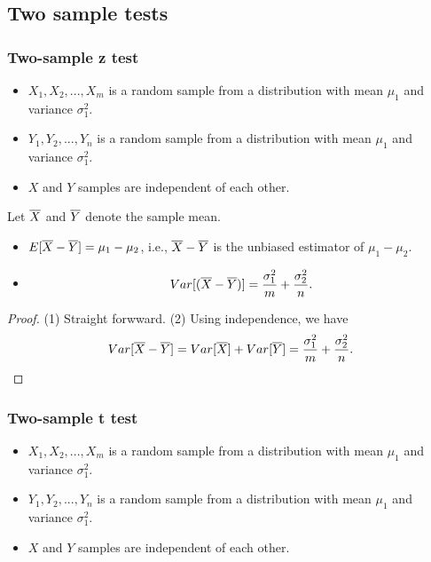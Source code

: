 \begin{refsection}
\subsection{Two sample tests}

\subsubsection{Two-sample z test}
\begin{note}\hfill
\begin{itemize}
	\item $X_1,X_2,...,X_m$ is a random sample from a distribution with mean $\mu_1$ and variance $\sigma_1^2$.
	\item $Y_1,Y_2,...,Y_n$ is a random sample from a distribution with mean $\mu_1$ and variance $\sigma_1^2$.
	\item $X$ and $Y$ samples are independent of each other. 
\end{itemize}	
\end{note}


\begin{lemma}\cite[363]{devore2015probability}Let $\overline{X}$ and $\overline{Y}$ denote the sample mean.
\begin{itemize}
	\item $E[\overline{X} - \overline{Y}] = \mu_1 - \mu_2$, i.e., $\overline{X} - \overline{Y}$ is the unbiased estimator of $\mu_1-\mu_2$.
	\item $$Var[(\overline{X} - \overline{Y})]=\frac{\sigma_1^2}{m} + \frac{\sigma_2^2}{n}.$$
\end{itemize}	
\end{lemma}
\begin{proof}
(1) Straight forwward. (2) Using independence, we have
$$Var[\overline{X} - \overline{Y}] = Var[\overline{X}] + Var[\overline{Y}] = \frac{\sigma_1^2}{m} + \frac{\sigma_2^2}{n}.$$

\end{proof}


\subsubsection{Two-sample t test}
\begin{note}\hfill
	\begin{itemize}
		\item $X_1,X_2,...,X_m$ is a random sample from a distribution with mean $\mu_1$ and variance $\sigma_1^2$.
		\item $Y_1,Y_2,...,Y_n$ is a random sample from a distribution with mean $\mu_1$ and variance $\sigma_1^2$.
		\item $X$ and $Y$ samples are independent of each other. 
	\end{itemize}	
\end{note}



\end{refsection}
